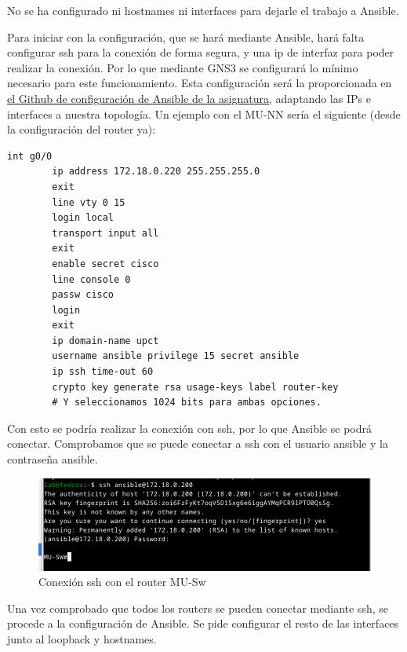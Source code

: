 \documentclass[11pt]{article}
\begin{document}
No se ha configurado ni hostnames ni interfaces para dejarle el trabajo a Ansible.

Para iniciar con la configuración, que se hará mediante Ansible, hará falta configurar ssh para la conexión de forma segura, y una ip de interfaz para poder realizar la conexión. Por lo que mediante GNS3 se configurará lo mínimo necesario para este funcionamiento. Esta configuración será la proporcionada en \href{https://github.com/plopezmp/GdR}{el Github de configuración de Ansible de la asignatura}, adaptando las IPs e interfaces a nuestra topología. Un ejemplo con el MU-NN sería el siguiente (desde la configuración del router ya):

\begin{tcolorbox}[
    boxrule=0pt,
]
    \begin{lstlisting}[gobble=6]
        int g0/0 
        ip address 172.18.0.220 255.255.255.0
        exit
        line vty 0 15
        login local
        transport input all
        exit 
        enable secret cisco 
        line console 0 
        passw cisco
        login 
        exit 
        ip domain-name upct 
        username ansible privilege 15 secret ansible
        ip ssh time-out 60
        crypto key generate rsa usage-keys label router-key
        # Y seleccionamos 1024 bits para ambas opciones.
    \end{lstlisting}
\end{tcolorbox}

Con esto se podría realizar la conexión con ssh, por lo que Ansible se podrá conectar. Comprobamos que se puede conectar a ssh con el usuario ansible y la contraseña ansible.

\begin{figure}[h]
    \centering
    \includegraphics[width=\textwidth]{src/ssh.png}
    \caption{Conexión ssh con el router MU-Sw}
\end{figure}

Una vez comprobado que todos los routers se pueden conectar mediante ssh, se procede a la configuración de Ansible. Se pide configurar el resto de las interfaces junto al loopback y hostnames. 
\end{document}
